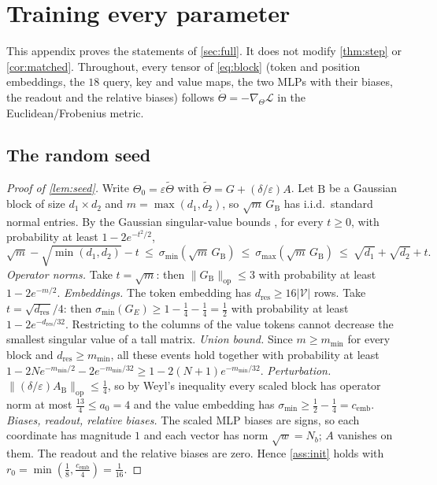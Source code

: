 
\section{Training every parameter}\label{app:full}
This appendix proves the statements of \cref{sec:full}. It does not modify \cref{thm:step} or \cref{cor:matched}. Throughout, every tensor of
\cref{eq:block} (token and position embeddings, the $18$ query, key and value maps, the two MLPs with their biases, the readout and
the relative biases) follows $\dot\Theta=-\nabla_\Theta\mathcal L$ in the Euclidean/Frobenius metric.

\subsection{The random seed}\label{app:seed}
\begin{proof}[Proof of \cref{lem:seed}]
Write $\Theta_0=\varepsilon\tilde\Theta$ with $\tilde\Theta=G+(\delta/\varepsilon)A$. Let $\mathrm B$ be a Gaussian block of size $d_1\times d_2$ and
$m=\max(d_1,d_2)$, so $\sqrt m\,G_{\mathrm B}$ has i.i.d.\ standard normal entries. By the Gaussian singular-value bounds
\citep[Chapter~7]{vershynin2018high}, for every $t\ge0$, with probability at least $1-2e^{-t^2/2}$,
\[
 \sqrt{m}-\sqrt{\min(d_1,d_2)}-t\ \le\ \sigma_{\min}(\sqrt m\,G_{\mathrm B})\ \le\ \sigma_{\max}(\sqrt m\,G_{\mathrm B})\ \le\ \sqrt{d_1}+\sqrt{d_2}+t .
\]
\emph{Operator norms.} Take $t=\sqrt m$: then $\|G_{\mathrm B}\|_{\mathrm{op}}\le3$ with probability at least $1-2e^{-m/2}$.
\emph{Embeddings.} The token embedding has $d_{\mathrm{res}}\ge16|\mathcal V|$ rows. Take $t=\sqrt{d_{\mathrm{res}}}/4$: then
$\sigma_{\min}(G_E)\ge1-\frac14-\frac14=\frac12$ with probability at least $1-2e^{-d_{\mathrm{res}}/32}$. Restricting to the columns of the value
tokens cannot decrease the smallest singular value of a tall matrix.
\emph{Union bound.} Since $m\ge m_{\min}$ for every block and $d_{\mathrm{res}}\ge m_{\min}$, all these events hold together with probability
at least $1-2Ne^{-m_{\min}/2}-2e^{-m_{\min}/32}\ge1-2(N+1)e^{-m_{\min}/32}$.
\emph{Perturbation.} $\|(\delta/\varepsilon)A_{\mathrm B}\|_{\mathrm{op}}\le\frac14$, so by Weyl's inequality every scaled block has operator norm at most
$\frac{13}{4}\le a_0=4$ and the value embedding has $\sigma_{\min}\ge\frac12-\frac14=c_{\mathrm{emb}}$.
\emph{Biases, readout, relative biases.} The scaled MLP biases are signs, so each coordinate has magnitude $1$ and each vector has norm
$\sqrt w=N_b$; $A$ vanishes on them. The readout and the relative biases are zero. Hence \cref{ass:init} holds with
$r_0=\min(\frac18,\frac{c_{\mathrm{emb}}}4)=\frac1{16}$.
\end{proof}

